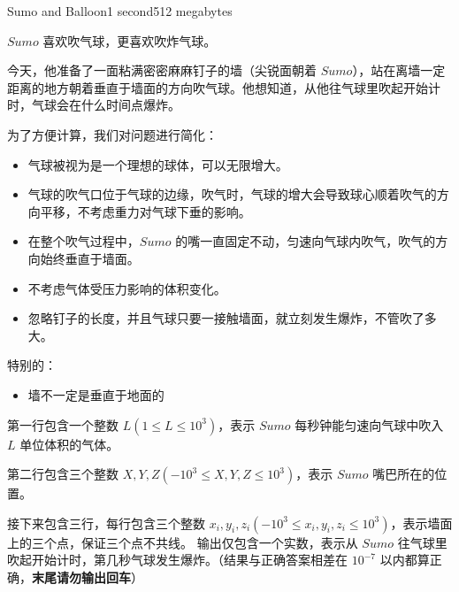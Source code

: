 \documentclass[11pt,a4paper,oneside]{article}
\begin{document}
\begin{problem}{Sumo and Balloon}{}{}{1 second}{512 megabytes}
	
	$Sumo$ 喜欢吹气球，更喜欢吹炸气球。
	
	今天，他准备了一面粘满密密麻麻钉子的墙（尖锐面朝着 $Sumo$），站在离墙一定距离的地方朝着垂直于墙面的方向吹气球。他想知道，从他往气球里吹起开始计时，气球会在什么时间点爆炸。
	
	为了方便计算，我们对问题进行简化：
	\begin{itemize}
		\item 气球被视为是一个理想的球体，可以无限增大。
		\item 气球的吹气口位于气球的边缘，吹气时，气球的增大会导致球心顺着吹气的方向平移，不考虑重力对气球下垂的影响。
		\item 在整个吹气过程中，$Sumo$ 的嘴一直固定不动，匀速向气球内吹气，吹气的方向始终垂直于墙面。
		\item 不考虑气体受压力影响的体积变化。
		\item 忽略钉子的长度，并且气球只要一接触墙面，就立刻发生爆炸，不管吹了多大。
	\end{itemize}
	特别的：
	\begin{itemize}
		\item 墙不一定是垂直于地面的
	\end{itemize}
	\InputFile
	第一行包含一个整数 $L(1 \leq L \leq 10^3)$，表示 $Sumo$ 每秒钟能匀速向气球中吹入 $L$ 单位体积的气体。
	
	第二行包含三个整数 $X,Y,Z(-10^3 \leq X,Y,Z \leq 10^3)$，表示 $Sumo$ 嘴巴所在的位置。
	
	接下来包含三行，每行包含三个整数 $x_i,y_i,z_i(-10^3 \leq x_i,y_i,z_i \leq 10^3)$，表示墙面上的三个点，保证三个点不共线。
	\OutputFile
	输出仅包含一个实数，表示从 $Sumo$ 往气球里吹起开始计时，第几秒气球发生爆炸。（结果与正确答案相差在 $10^{-7}$ 以内都算正确，\textbf{末尾请勿输出回车}）
	
	\Examples
	\begin{example}
	\end{example}
	
\end{problem}
\end{document}
